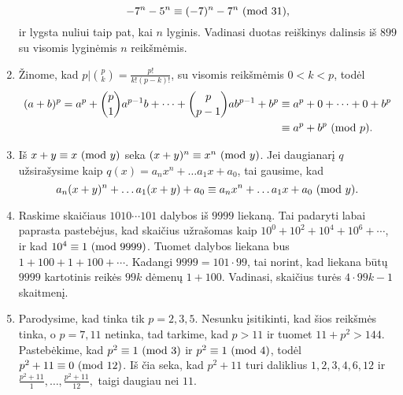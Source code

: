 \begin{enumerate}
$$    - 7^n -5^n\equiv (-7)^n - 7^n \ (\text{mod } 31),$$ ir lygsta nuliui taip pat, kai
    $n$ lyginis. Vadinasi duotas reiškinys dalinsis iš $899$ su visomis
    lyginėmis $n$ reikšmėmis.
\item
    Žinome, kad $p|\binom{p}{k} = \frac{p!}{k!(p-k)!}$, su visomis
    reikšmėmis $0<k<p$, todėl 
    \begin{align*}
    (a+b)^p = a^p + \binom{p}{1}a^{p-1}b + \cdots + \binom{p}{p-1}ab^{p-1}
    + b^p & \equiv a^p + 0 + \cdots + 0 + b^p \\ 
          & \equiv a^p + b^p \ (\text{mod } p). 
    \end{align*}
\item
    Iš $x+y \equiv x \ (\text{mod } y)$ seka $(x+y)^n \equiv x^n \ (\text{mod } y)$. Jei
    daugianarį $q$ užsirašysime kaip $q(x) = a_nx^n + \dots a_1x + a_0$,
    tai gausime, kad $$a_n(x+y)^n + \dots a_1(x+y) + a_0 \equiv a_nx^n +
    \dots a_1x + a_0 \ (\text{mod } y).$$
\item
    Raskime skaičiaus $1010\cdots101$ dalybos iš $9999$ liekaną. Tai
    padaryti labai paprasta pastebėjus, kad skaičius užrašomas kaip $10^0 +
    10^2 + 10^4 + 10^6 + \cdots $, ir kad $10^4 \equiv 1 \ (\text{mod } 9999)$. Tuomet
    dalybos liekana bus $1 + 100 + 1 + 100 + \cdots$.  Kadangi $9999=101
    \cdot 99$, tai norint, kad liekana būtų $9999$ kartotinis reikės
    $99k$ dėmenų $1 + 100$. Vadinasi, skaičius turės $4\cdot 99k - 1$
    skaitmenį.
\item
    Parodysime, kad tinka tik $p=2,3,5$. Nesunku įsitikinti, kad šios
    reikšmės tinka, o $p = 7,11$ netinka, tad tarkime, kad $p>11$ ir tuomet
    $11 + p^2> 144.$ Pastebėkime, kad $p^2 \equiv 1 \ (\text{mod } 3)$ ir $p^2 \equiv 1
    \ (\text{mod } 4)$, todėl $p^2 + 11 \equiv 0 \ (\text{mod } 12)$. Iš čia seka, kad $p^2 + 11$
    turi daliklius $1, 2, 3, 4, 6, 12$ ir $\frac{p^2 + 11}{1}, \dots,
    \frac{p^2 + 11}{12},$ taigi daugiau nei $11$.
\end{enumerate} 
